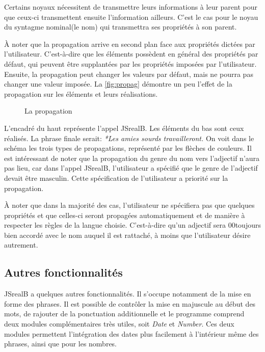 \documentclass[11pt]{article} %
\newcommand{\system}[1]{\textsf{#1}}
\newcommand{\JSB}{\system{JSrealB}}
\newcommand{\real}[1]{\emph{#1}}
\begin{document}
Certains noyaux nécessitent de transmettre leurs informations à leur
parent pour que ceux-ci transmettent ensuite l'information ailleurs.
C'est le cas pour le noyau du syntagme nominal(le nom) qui transmettra
ses propriétés à son parent.

À noter que la propagation arrive en second plan face aux propriétés
dictées par l'utilisateur. C'est-à-dire que les éléments possèdent
en général des propriétés par défaut, qui peuvent être supplantées
par les propriétés imposées par l'utilisateur. Ensuite, la propagation
peut changer les valeurs par défaut, mais ne pourra pas changer une
valeur imposée. La \autoref{fig:propag} démontre un peu l'effet de la propagation
sur les éléments et leurs réalisations.
\begin{figure}
\centering
\caption{La propagation}
\label{fig:propag}
\end{figure}

L'encadré du haut représente l'appel \JSB{}. Les éléments du bas sont ceux
réalisés. La phrase finale serait: \real{*Les amies sourds travailleront.}
On voit dans le schéma les trois types de propagations, représenté
par les flèches de couleurs. Il est intéressant de noter que la propagation
du genre du nom vers l'adjectif n'aura pas lieu, car dans l'appel
\JSB{}, l'utilisateur a spécifié que le genre de l'adjectif devait
être masculin. Cette spécification de l'utilisateur a priorité sur
la propagation.

À noter que dans la majorité des cas, l'utilisateur ne spécifiera pas
que quelques propriétés et que celles-ci seront propagées automatiquement
et de manière à respecter les règles de la langue choisie. C'est-à-dire qu'un
adjectif sera 00toujours bien accordé avec le nom auquel il est rattaché, à moins
que l'utilisateur désire autrement.

\subsection{Autres fonctionnalités}

\JSB{} a quelques autres fonctionnalités. Il s'occupe notamment de
la mise en forme des phrases. Il est possible de contrôler la mise
en majuscule au début des mots, de rajouter de la ponctuation additionnelle
et le programme comprend deux modules complémentaires très utiles,
soit \emph{Date} et \emph{Number}. Ces deux modules permettent l'intégration
des dates plus facilement à l'intérieur même des phrases, ainsi que
pour les nombres. 
\end{document}
